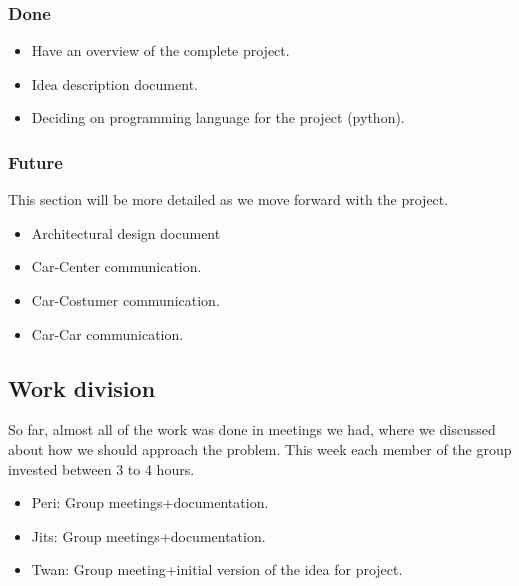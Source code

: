 \documentclass[a4paper]{article}
\begin{document}
\subsubsection*{Done}
\begin{itemize}
    \item Have an overview of the complete project.
    \item Idea description document.
    \item Deciding on programming language for the project (python).
\end{itemize}

\subsubsection*{Future}
This section will be more detailed as we move forward with the project.
\begin{itemize}
    \item Architectural design document
    \item Car-Center communication.
    \item Car-Costumer communication.
    \item Car-Car communication.
\end{itemize}

\subsection*{Work division}
So far, almost all of the work was done in meetings we had, where we discussed about how we should approach the problem. This week each member of the group invested between 3 to 4 hours.
\begin{itemize}
    \item Peri: Group meetings+documentation.
    \item Jits: Group meetings+documentation.
    \item Twan: Group meeting+initial version of the idea for project.
\end{itemize}
\end{document}
